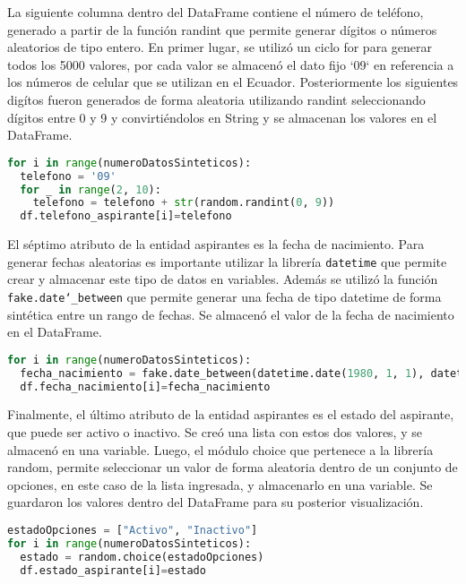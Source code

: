 \documentclass[10pt, oneside,spanish]{article}   	%
\begin{document}
 La siguiente columna dentro del DataFrame contiene el número de teléfono, generado a partir de la función randint que permite generar dígitos o números aleatorios de tipo entero. En primer lugar, se utilizó un ciclo for para generar todos los 5000 valores, por cada valor se almacenó el dato fijo `09` en referencia a los números de celular que se utilizan en el Ecuador. Posteriormente los siguientes digítos fueron generados de forma aleatoria utilizando randint seleccionando dígitos entre 0 y 9 y convirtiéndolos en String y se almacenan los valores en el DataFrame.
 
 \begin{lstlisting}[language=Python, caption=Python example,numbers=none,xleftmargin=.15in,xrightmargin=.15in]  
for i in range(numeroDatosSinteticos):
  telefono = '09'
  for _ in range(2, 10):
    telefono = telefono + str(random.randint(0, 9))
  df.telefono_aspirante[i]=telefono
 \end{lstlisting}
 
 El séptimo atributo de la entidad aspirantes es la fecha de nacimiento. Para generar fechas aleatorias es importante utilizar la librería \texttt{datetime} que permite crear y almacenar este tipo de datos en variables. Además se utilizó la función \texttt{fake.date\char`_between} que permite generar una fecha de tipo datetime de forma sintética entre un rango de fechas. Se almacenó el valor de la fecha de nacimiento en el DataFrame.
 
  \begin{lstlisting}[language=Python, caption=Python example,numbers=none,xleftmargin=.15in,xrightmargin=.15in]  
for i in range(numeroDatosSinteticos):
  fecha_nacimiento = fake.date_between(datetime.date(1980, 1, 1), datetime.date(2007, 1, 1))
  df.fecha_nacimiento[i]=fecha_nacimiento
 \end{lstlisting}
 Finalmente, el último atributo de la entidad aspirantes es el estado del aspirante, que puede ser activo o inactivo. Se creó una lista con estos dos valores, y se almacenó en una variable. Luego, el módulo choice que pertenece a la librería random, permite seleccionar un valor de forma aleatoria dentro de un conjunto de opciones, en este caso de la lista ingresada, y almacenarlo en una variable. Se guardaron los valores dentro del DataFrame para su posterior visualización.
 
   \begin{lstlisting}[language=Python, caption=Python example,numbers=none,xleftmargin=.15in,xrightmargin=.15in]  
estadoOpciones = ["Activo", "Inactivo"]
for i in range(numeroDatosSinteticos):
  estado = random.choice(estadoOpciones)
  df.estado_aspirante[i]=estado
  \end{lstlisting}
  
\end{document}
